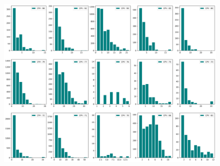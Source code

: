 


\begin{figure}[H]
	\centering
	\includegraphics[width=\textwidth]{imagens/r019_hist1.png}
\end{figure}

